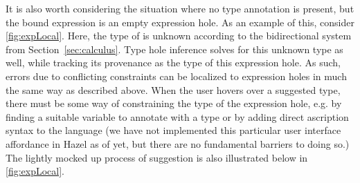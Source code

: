 
It is also worth considering the situation where no type annotation is present, but the bound expression is an empty expression hole. As an example of this, consider \cref{fig:expLocal}. Here, the type of  is unknown according to the bidirectional system from Section~\ref{sec:calculus}. Type hole inference solves for this unknown type as well, while tracking its provenance as the type of this expression hole. As such, errors due to conflicting constraints can be localized to expression holes in much the same way as described above. When the user hovers over a suggested type, there must be some way of constraining the type of the expression hole, e.g. by finding a suitable variable to annotate with a type or by adding direct ascription syntax to the language (we have not implemented this particular user interface affordance in Hazel as of yet, but there are no fundamental barriers to doing so.) The lightly mocked up process of suggestion is also illustrated below in \cref{fig:expLocal}.

